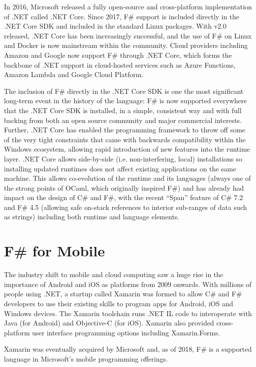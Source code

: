 \documentclass[acmsmall,review]{acmart}\settopmatter{printfolios=true,printccs=false,printacmref=false}
\begin{document}
In 2016, Microsoft released a fully open-source and cross-platform implementation of .NET called .NET Core.  Since 2017, F\# support
is included directly in the .NET Core SDK and included in the standard Linux packages. With v2.0 released, .NET Core has been
increasingly successful, and the use of F\# on Linux and Docker is now mainstream within the community.  Cloud providers including
Amazon and Google now support F\# through .NET Core, which forms the backbone of .NET support in cloud-hosted services
such as Azure Functions, Amazon Lambda and Google Cloud Platform.

The inclusion of F\# directly in the .NET Core SDK is one the most significant long-term event in the history of the
language: F\# is now supported everywhere that the .NET Core SDK is installed, in a simple, consistent way and with full
backing from both an open source community and major commercial interests. Further, .NET Core has enabled the programming
framework to throw off some of the very tight constraints that came with backwards compatibility within the Windows
ecosystem, allowing rapid introduction of new features into the runtime layer. .NET Core allows side-by-side (i.e. non-interfering,
local) installations so installing updated runtimes does not affect existing applications on the same machine. This allows co-evolution
of the runtime and its languages (always one of the strong points of OCaml, which originally inspired F\#) and has already had
impact on the design of C\# and F\#, with the recent “Span” feature of C\# 7.2 and F\# 4.5 (allowing safe on-stack references
to interior sub-ranges of data such as strings) including both runtime and language elements.

\section*{F\# for Mobile}


The industry shift to mobile and cloud computing saw a huge rise in the importance of Android and iOS as platforms from 2009
onwards.  With millions of people using .NET, a startup called Xamarin was formed to allow C\# and F\# developers to use their
existing skills to program apps for Android, iOS and Windows devices.  The Xamarin toolchain runs .NET IL code to interoperate
with Java (for Android) and Objective-C (for iOS).  Xamarin also provided cross-platform user interface programming options including Xamarin.Forms. 

Xamarin was eventually acquired by Microsoft and, as of 2018, F\# is a supported language in Microsoft’s mobile programming offerings.
\end{document}
